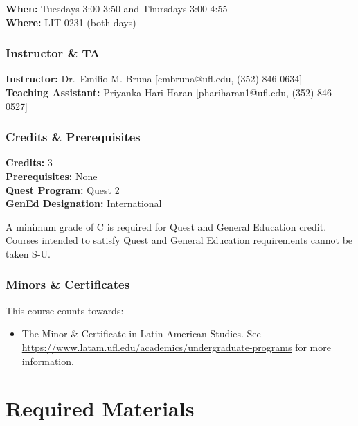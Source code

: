 \documentclass[
  10pt,
  letterpaper,
  oneside,
  open=any]{scrbook}
\providecommand{\tightlist}{%
  \setlength{\itemsep}{0pt}\setlength{\parskip}{0pt}}\usepackage{longtable,booktabs,array}
\begin{document}
\textbf{When:} Tuesdays 3:00-3:50 and Thursdays 3:00-4:55\\
\textbf{Where:} LIT 0231 (both days)

\subsection*{Instructor \& TA}\label{instructor-ta}

\textbf{Instructor:} Dr.~Emilio M. Bruna {[}embruna@ufl.edu, (352)
846-0634{]}\\
\textbf{Teaching Assistant:} Priyanka Hari Haran {[}phariharan1@ufl.edu,
(352) 846-0527{]}

\subsection*{Credits \& Prerequisites}\label{credits-prerequisites}

\textbf{Credits:} 3\\
\textbf{Prerequisites:} None\\
\textbf{Quest Program:} Quest 2 \\
\textbf{GenEd Designation:} International

A minimum grade of C is required for Quest and General Education credit.
Courses intended to satisfy Quest and General Education requirements
cannot be taken S-U.

\subsection*{Minors \& Certificates}\label{minors-certificates}

This course counts towards:

\begin{itemize}
\tightlist
\item
  The Minor \& Certificate in Latin American Studies. See
  \url{https://www.latam.ufl.edu/academics/undergraduate-programs} for
  more information.
\end{itemize}


\chapter{Required Materials}\label{required-materials}
\end{document}
